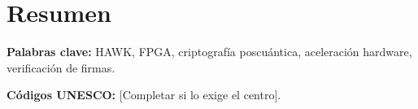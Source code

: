 \chapter*{Resumen}
\vspace{0.5cm}
\noindent\textbf{Palabras clave:} HAWK, FPGA, criptografía poscuántica, aceleración hardware, verificación de firmas.
\par\medskip
\noindent\textbf{Códigos UNESCO:} [Completar si lo exige el centro].
